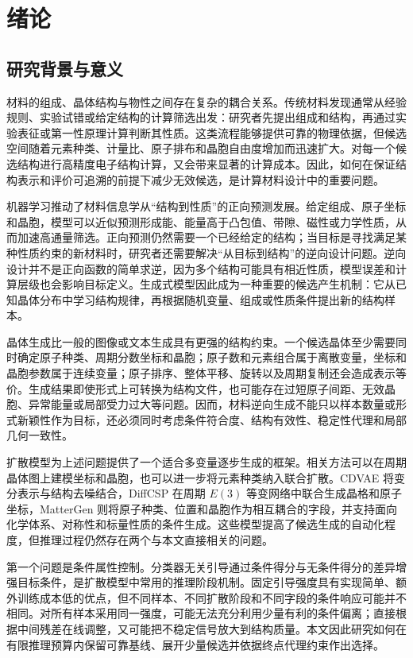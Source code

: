 \chapter{绪论}

\section{研究背景与意义}

材料的组成、晶体结构与物性之间存在复杂的耦合关系。传统材料发现通常从经验规则、实验试错或给定结构的计算筛选出发：研究者先提出组成和结构，再通过实验表征或第一性原理计算判断其性质。这类流程能够提供可靠的物理依据，但候选空间随着元素种类、计量比、原子排布和晶胞自由度增加而迅速扩大。对每一个候选结构进行高精度电子结构计算，又会带来显著的计算成本。因此，如何在保证结构表示和评价可追溯的前提下减少无效候选，是计算材料设计中的重要问题。

机器学习推动了材料信息学从``结构到性质''的正向预测发展。给定组成、原子坐标和晶胞，模型可以近似预测形成能、能量高于凸包值、带隙、磁性或力学性质，从而加速高通量筛选。正向预测仍然需要一个已经给定的结构；当目标是寻找满足某种性质约束的新材料时，研究者还需要解决``从目标到结构''的逆向设计问题。逆向设计并不是正向函数的简单求逆，因为多个结构可能具有相近性质，模型误差和计算层级也会影响目标定义。生成式模型因此成为一种重要的候选产生机制：它从已知晶体分布中学习结构规律，再根据随机变量、组成或性质条件提出新的结构样本\citep{nouira2018,xie2022,jiao2023}。

晶体生成比一般的图像或文本生成具有更强的结构约束。一个候选晶体至少需要同时确定原子种类、周期分数坐标和晶胞；原子数和元素组合属于离散变量，坐标和晶胞参数属于连续变量；原子排序、整体平移、旋转以及周期复制还会造成表示等价。生成结果即使形式上可转换为结构文件，也可能存在过短原子间距、无效晶胞、异常能量或局部受力过大等问题。因而，材料逆向生成不能只以样本数量或形式新颖性作为目标，还必须同时考虑条件符合度、结构有效性、稳定性代理和局部几何一致性。

扩散模型为上述问题提供了一个适合多变量逐步生成的框架。相关方法可以在周期晶体图上建模坐标和晶胞，也可以进一步将元素种类纳入联合扩散。CDVAE 将变分表示与结构去噪结合，DiffCSP 在周期 \(E(3)\) 等变网络中联合生成晶格和原子坐标，MatterGen 则将原子种类、位置和晶胞作为相互耦合的字段，并支持面向化学体系、对称性和标量性质的条件生成\citep{xie2022,jiao2023,jiao2024,zeni2025}。这些模型提高了候选生成的自动化程度，但推理过程仍然存在两个与本文直接相关的问题。

第一个问题是条件属性控制。分类器无关引导通过条件得分与无条件得分的差异增强目标条件，是扩散模型中常用的推理阶段机制\citep{ho2020,song2021,ho2022}。固定引导强度具有实现简单、额外训练成本低的优点，但不同样本、不同扩散阶段和不同字段的条件响应可能并不相同。对所有样本采用同一强度，可能无法充分利用少量有利的条件偏离；直接根据中间残差在线调整，又可能把不稳定信号放大到结构质量。本文因此研究如何在有限推理预算内保留可靠基线、展开少量候选并依据终点代理约束作出选择。

